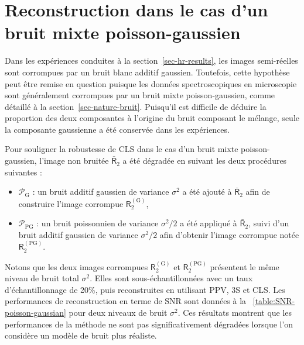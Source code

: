 \section{Reconstruction dans le cas d'un bruit mixte poisson-gaussien}\label{sec-bruit-mixte}

Dans les expériences conduites à la section~\ref{sec-hr-results}, les images semi-réelles sont corrompues par un bruit blanc additif gaussien. Toutefois, cette hypothèse peut être remise en question puisque les données spectroscopiques en microscopie sont généralement corrompues par un bruit mixte poisson-gaussien, comme détaillé à la section~\ref{sec-nature-bruit}. Puisqu'il est difficile de déduire la proportion des deux composantes à l'origine du bruit composant le mélange, seule la composante gaussienne a été conservée dans les expériences.

Pour souligner la robustesse de CLS dans le cas d'un bruit mixte poisson-gaussien, l'image non bruitée $\bar{\mathsf{R}}_2$ a été dégradée en suivant les deux procédures suivantes :
\begin{itemize}
    \item $\mathcal{P}_{\mathrm{G}}$ : un bruit additif gaussien de variance $\sigma^2$ a été ajouté à $\bar{\mathsf{R}}_2$ afin de construire l'image corrompue $\mathsf{R}_2^{(\mathrm{G})}$,
    \item $\mathcal{P}_{\mathrm{PG}}$ : un bruit poissonnien de variance $\sigma^2/2$ a été appliqué à $\bar{\mathsf{R}}_2$, suivi d'un bruit additif gaussien de variance $\sigma^2/2$ afin d'obtenir l'image corrompue notée $\mathsf{R}_2^{(\mathrm{PG})}$.
\end{itemize}
Notons que les deux images corrompues $\mathsf{R}_2^{(\mathrm{G})}$ et $\mathsf{R}_2^{(\mathrm{PG})}$ présentent le même niveau de bruit total $\sigma^2$. Elles sont sous-échantillonnées avec un taux d'échantillonnage de 20\%, puis reconstruites en utilisant PPV, 3S et CLS. Les performances de reconstruction en terme de SNR sont données à la \tabname~\ref{table:SNR-poisson-gaussian} pour deux niveaux de bruit $\sigma^2$. Ces résultats montrent que les performances de la méthode ne sont pas significativement dégradées lorsque l'on considère un modèle de bruit plus réaliste.

